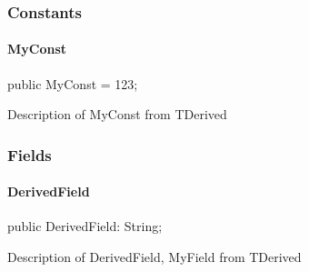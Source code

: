 \documentclass{report}
\begin{document}
\subsubsection*{\large{\textbf{Constants}}\normalsize\hspace{1ex}\hfill}
\paragraph*{MyConst}\hspace*{\fill}

\begin{list}{}{
\setlength{\itemindent}{0cm}
\setlength{\listparindent}{0cm}
\setlength{\leftmargin}{\evensidemargin}
\addtolength{\leftmargin}{\tmplength}
\settowidth{\labelsep}{X}
\addtolength{\leftmargin}{\labelsep}
\setlength{\labelwidth}{\tmplength}
}
\begin{flushleft}
\item[\textbf{Declaration}\hfill]
\begin{ttfamily}
public MyConst = 123;\end{ttfamily}


\end{flushleft}
\par
\item[\textbf{Description}]
Description of MyConst from TDerived

\end{list}
\subsubsection*{\large{\textbf{Fields}}\normalsize\hspace{1ex}\hfill}
\paragraph*{DerivedField}\hspace*{\fill}

\begin{list}{}{
\setlength{\itemindent}{0cm}
\setlength{\listparindent}{0cm}
\setlength{\leftmargin}{\evensidemargin}
\addtolength{\leftmargin}{\tmplength}
\settowidth{\labelsep}{X}
\addtolength{\leftmargin}{\labelsep}
\setlength{\labelwidth}{\tmplength}
}
\begin{flushleft}
\item[\textbf{Declaration}\hfill]
\begin{ttfamily}
public DerivedField: String;\end{ttfamily}


\end{flushleft}
\par
\item[\textbf{Description}]
Description of DerivedField, MyField from TDerived

\end{list}
\end{document}
